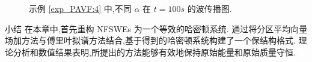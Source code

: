 \documentclass[aspectratio=169]{beamer}
\numberwithin{theorem}{section} %
\begin{document}
\begin{frame}%
	\begin{figure}[H]
		\begin{center}
		  
		\caption{示例 \ref{exp_PAVF:4} 中,不同 $\alpha$ 在 $t=100s$ 的波传播图.}
		\label{fig_PAVF:13}
		\end{center}
		\end{figure}
\end{frame}

\begin{frame}{小结}
	在本章中,首先重构 NFSWEs 为一个等效的哈密顿系统.
通过将分区平均向量场加方法与傅里叶拟谱方法结合,基于得到的哈密顿系统构建了一个保结构格式.
理论分析和数值结果表明,所提出的方法能够有效地\textcolor[rgb]{0.227,0.373,0.306}{保持原始能量和原始质量守恒.}
\end{frame}
\end{document}

